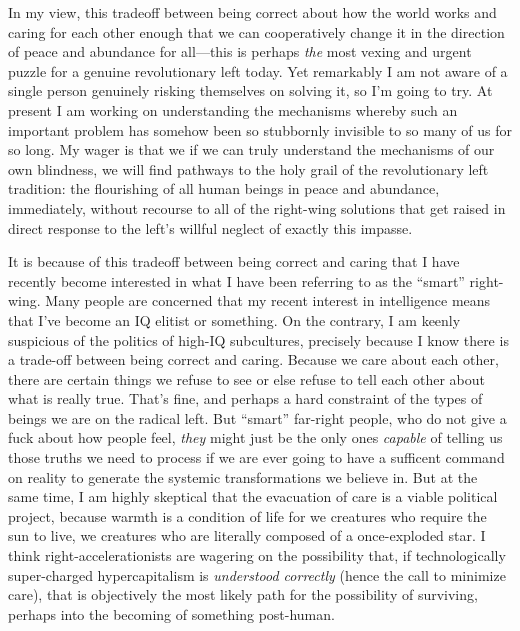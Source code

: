 \documentclass[a4paper,12pt,margin=.5in]{article}
\begin{document}
In my view, this tradeoff between being correct about how the world
works and caring for each other enough that we can cooperatively change
it in the direction of peace and abundance for all---this is perhaps
\emph{the} most vexing and urgent puzzle for a genuine revolutionary
left today. Yet remarkably I am not aware of a single person genuinely
risking themselves on solving it, so I'm going to try. At present I am
working on understanding the mechanisms whereby such an important
problem has somehow been so stubbornly invisible to so many of us for so
long. My wager is that we if we can truly understand the mechanisms of
our own blindness, we will find pathways to the holy grail of the
revolutionary left tradition: the flourishing of all human beings in
peace and abundance, immediately, without recourse to all of the
right-wing solutions that get raised in direct response to the left's
willful neglect of exactly this impasse.

It is because of this tradeoff between being correct and caring that I
have recently become interested in what I have been referring to as the
``smart'' right-wing. Many people are concerned that my recent interest
in intelligence means that I've become an IQ elitist or something. On
the contrary, I am keenly suspicious of the politics of high-IQ
subcultures, precisely because I know there is a trade-off between being
correct and caring. Because we care about each other, there are certain
things we refuse to see or else refuse to tell each other about what is
really true. That's fine, and perhaps a hard constraint of the types of
beings we are on the radical left. But ``smart'' far-right people, who
do not give a fuck about how people feel, \emph{they} might just be the
only ones \emph{capable} of telling us those truths we need to process
if we are ever going to have a sufficent command on reality to generate
the systemic transformations we believe in. But at the same time, I am
highly skeptical that the evacuation of care is a viable political
project, because warmth is a condition of life for we creatures who
require the sun to live, we creatures who are literally composed of a
once-exploded star. I think right-accelerationists are wagering on the
possibility that, if technologically super-charged hypercapitalism is
\emph{understood correctly} (hence the call to minimize care), that is
objectively the most likely path for the possibility of surviving,
perhaps into the becoming of something post-human.
\end{document}

